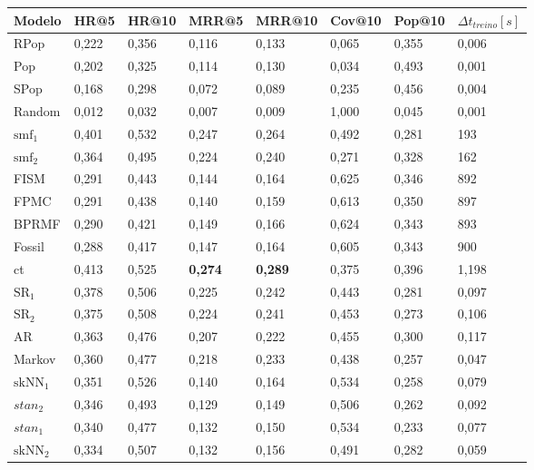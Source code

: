 \begin{table}[htbp]
  \centering
  \begin{tabular}{|l|l|l|l|l|l|l|l|}
    \hline
    Modelo & HR@5 & HR@10 & MRR@5 & MRR@10 & Cov@10 & Pop@10 & $\Delta t_{treino} [s]$ \\
    \hline
    RPop & 0,222 & 0,356 & 0,116 & 0,133 & 0,065 & 0,355 & 0,006 \\
    \hline
    Pop & 0,202 & 0,325 & 0,114 & 0,130 & 0,034 & 0,493 & 0,001 \\
    \hline
    SPop & 0,168 & 0,298 & 0,072 & 0,089 & 0,235 & 0,456 & 0,004 \\
    \hline
    Random & 0,012 & 0,032 & 0,007 & 0,009 & 1,000 & 0,045 & 0,001 \\
    \hline
    \hline
    $\text{smf}_{1}$ & 0,401 & 0,532 & 0,247 & 0,264 & 0,492 & 0,281 & 193 \\
    \hline
    $\text{smf}_{2}$ & 0,364 & 0,495 & 0,224 & 0,240 & 0,271 & 0,328 & 162 \\
    \hline
    FISM & 0,291 & 0,443 & 0,144 & 0,164 & 0,625 & 0,346 & 892 \\
    \hline
    FPMC & 0,291 & 0,438 & 0,140 & 0,159 & 0,613 & 0,350 & 897 \\
    \hline
    BPRMF & 0,290 & 0,421 & 0,149 & 0,166 & 0,624 & 0,343 & 893 \\
    \hline
    Fossil & 0,288 & 0,417 & 0,147 & 0,164 & 0,605 & 0,343 & 900 \\
    \hline
    \hline
    ct & 0,413 & 0,525 & \textbf{0,274} & \textbf{0,289} & 0,375 & 0,396 & 1,198 \\
    \hline
    $\text{SR}_{1}$ & 0,378 & 0,506 & 0,225 & 0,242 & 0,443 & 0,281 & 0,097 \\
    \hline
    $\text{SR}_{2}$ & 0,375 & 0,508 & 0,224 & 0,241 & 0,453 & 0,273 & 0,106 \\
    \hline
    AR & 0,363 & 0,476 & 0,207 & 0,222 & 0,455 & 0,300 & 0,117 \\
    \hline
    Markov & 0,360 & 0,477 & 0,218 & 0,233 & 0,438 & 0,257 & 0,047 \\
    \hline
    $\text{skNN}_{1}$ & 0,351 & 0,526 & 0,140 & 0,164 & 0,534 & 0,258 & 0,079 \\
    \hline
    $stan_{2}$ & 0,346 & 0,493 & 0,129 & 0,149 & 0,506 & 0,262 & 0,092 \\
    \hline
    $stan_{1}$ & 0,340 & 0,477 & 0,132 & 0,150 & 0,534 & 0,233 & 0,077 \\
    \hline
    $\text{skNN}_{2}$ & 0,334 & 0,507 & 0,132 & 0,156 & 0,491 & 0,282 & 0,059 \\

\end{tabular}
\end{table}
